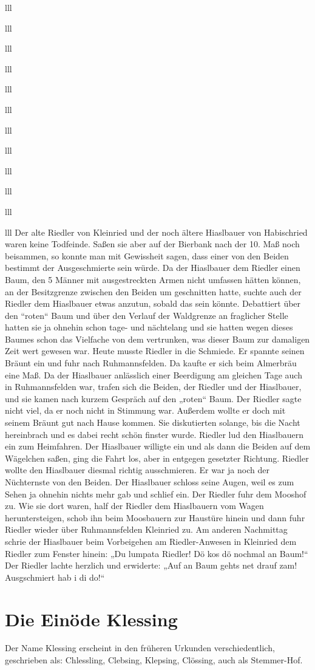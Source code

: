 \documentclass[12pt,a4pager]{book}
\begin{document}
\begin{tabuluar}{lll}
\begin{tabuluar}{lll}
\begin{tabuluar}{lll}
\begin{tabuluar}{lll}
\begin{tabuluar}{lll}
\begin{tabuluar}{lll}
\begin{tabuluar}{lll}
\begin{tabuluar}{lll}
\begin{tabuluar}{lll}
\begin{tabuluar}{lll}
\begin{tabuluar}{lll}
\begin{tabuluar}{lll}
Der alte Riedler von Kleinried und der noch ältere Hiaslbauer von Habischried
waren keine Todfeinde. Saßen sie aber auf der Bierbank nach der 10. Maß noch
beisammen, so konnte man mit Gewissheit sagen, dass einer von den Beiden
bestimmt der Ausgeschmierte sein würde. Da der Hiaslbauer dem Riedler einen
Baum, den 5 Männer mit ausgestreckten Armen nicht umfassen hätten können, an der
Besitzgrenze zwischen den Beiden um geschnitten hatte, suchte auch der Riedler
dem Hiaslbauer etwas anzutun, sobald das sein könnte. Debattiert über den
“roten“ Baum und über den Verlauf der Waldgrenze an fraglicher Stelle hatten sie
ja ohnehin schon tage- und nächtelang und sie hatten wegen dieses Baumes schon
das Vielfache von dem vertrunken, was dieser Baum zur damaligen Zeit wert
gewesen war. Heute musste Riedler in die Schmiede. Er spannte seinen Bräunt ein
und fuhr nach Ruhmannsfelden. Da kaufte er sich beim Almerbräu eine Maß. Da der
Hiaslbauer anlässlich einer Beerdigung am gleichen Tage auch in Ruhmannsfelden
war, trafen sich die Beiden, der Riedler und der Hiaslbauer, und sie kamen nach
kurzem Gespräch auf den „roten“ Baum. Der Riedler sagte nicht viel, da er noch
nicht in Stimmung war. Außerdem wollte er doch mit seinem Bräunt gut nach Hause
kommen. Sie diskutierten solange, bis die Nacht hereinbrach und es dabei recht
schön finster wurde. Riedler lud den Hiaslbauern ein zum Heimfahren. Der
Hiaslbauer willigte ein und als dann die Beiden auf dem Wägelchen saßen, ging
die Fahrt los, aber in entgegen gesetzter Richtung. Riedler wollte den
Hiaslbauer diesmal richtig ausschmieren. Er war ja noch der Nüchternste von den
Beiden. Der Hiaslbauer schloss seine Augen, weil es zum Sehen ja ohnehin nichts
mehr gab und schlief ein. Der Riedler fuhr dem Mooshof zu. Wie sie dort waren,
half der Riedler dem Hiaslbauern vom Wagen heruntersteigen, schob ihn beim
Moosbauern zur Haustüre hinein und dann fuhr Riedler wieder über Ruhmannsfelden
Kleinried zu. Am anderen Nachmittag schrie der Hiaslbauer beim Vorbeigehen am
Riedler-Anwesen in Kleinried dem Riedler zum Fenster hinein: „Du lumpata
Riedler! Dö kos dö nochmal an Baum!“ Der Riedler lachte herzlich und erwiderte:
„Auf an Baum gehts net drauf zam! Ausgschmiert hab i di do!“

\section{Die Einöde Klessing}

Der Name Klessing erscheint in den früheren Urkunden verschiedentlich,
geschrieben als: Chlessling, Clebsing, Klepsing, Clössing, auch als Stemmer-Hof.


\end{tabuluar}
\end{tabuluar}
\end{tabuluar}
\end{tabuluar}
\end{tabuluar}
\end{tabuluar}
\end{tabuluar}
\end{tabuluar}
\end{tabuluar}
\end{tabuluar}
\end{tabuluar}
\end{tabuluar}
\end{document}
